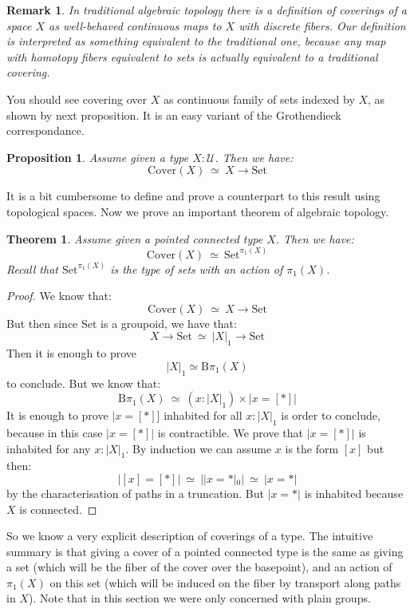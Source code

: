 \documentclass{article}
\newcommand{\U}{{\mathcal U}}
\renewcommand{\r}{\rightarrow}
\newcommand{\B}{\mathrm{B}}
\newcommand{\Set}{\mathrm{Set}}
\newtheorem{proposition}{Proposition}
\newtheorem{theorem}{Theorem}
\newtheorem{remark}{Remark}
\begin{document}
\begin{remark}
In traditional algebraic topology there is a definition of coverings of a space $X$ as well-behaved continuous maps to $X$ with discrete fibers. Our definition is interpreted as something equivalent to the traditional one, because any map with homotopy fibers equivalent to sets is actually equivalent to a traditional covering.
\end{remark}

You should see covering over $X$ as continuous family of sets indexed by $X$, as shown by next proposition. It is an easy variant of the Grothendieck correspondance.

\begin{proposition}
Assume given a type $X:\U$. Then we have:
\[\mathrm{Cover}(X) \ \simeq\ X \r \Set\]
\end{proposition}

It is a bit cumbersome to define and prove a counterpart to this result using topological spaces. Now we prove an important theorem of algebraic topology.

\begin{theorem}
Assume given a pointed connected type $X$. Then we have:
\[\mathrm{Cover}(X) \ \simeq\ \Set^{\pi_1(X)}\]
Recall that $\Set^{\pi_1(X)}$ is the type of sets with an action of $\pi_1(X)$.
\end{theorem}
\begin{proof}
We know that:
\[\mathrm{Cover}(X)\ \simeq\ X\r \Set\]
But then since $\Set$ is a groupoid, we have that:
\[X\r\Set \ \simeq\ |X|_1\r \Set\]
Then it is enough to prove 
\[|X|_1 \simeq \B\pi_1(X)\] 
to conclude. But we know that:
\[\B\pi_1(X) \ \simeq \ (x:|X|_1)\times |x=[*]|\]
It is enough to prove $|x=[*]]$ inhabited for all $x:|X|_1$ is order to conclude, because in this case $|x=[*]|$ is contractible.
We prove that $|x=[*]|$ is inhabited for any $x:|X|_1$. By induction we can assume $x$ is the form $[x]$ but then:
\[|[x]=[*]| \ \simeq \ ||x=*|_0| \ \simeq\ |x=*|\]
by the characterisation of paths in a truncation. But $|x=*|$ is inhabited because $X$ is connected.
\end{proof}

So we know a very explicit description of coverings of a type. The intuitive summary is that giving a cover of a pointed connected type is the same as giving a set (which will be the fiber of the cover over the basepoint), and an action of $\pi_1(X)$ on this set (which will be induced on the fiber by transport along paths in $X$). Note that in this section we were only concerned with plain groups.
\end{document}
